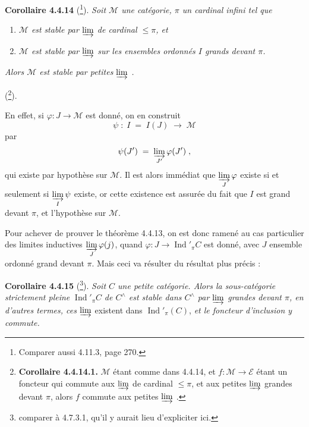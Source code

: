 \documentclass[11pt]{article}
\newcommand{\printedpage}[1]{\if\relax\detokenize{#1}\relax\else\marginpar{\footnotesize p.~#1}\fi}
\newcommand{\msp}[1]{\marginpar{\footnotesize [#1]}}
\newcommand{\Ind}{\operatorname{Ind}}
\begin{document}
\textbf{Corollaire 4.4.14} (\footnote{Comparer aussi 4.11.3, page 270.}). \textit{Soit $\mathcal{M}$ une catégorie, $\pi$ un cardinal infini tel que}
\begin{enumerate}
\item[a)] \textit{$\mathcal{M}$ est}
\msp{page 98}
\textit{stable par $\varinjlim$ de cardinal $\leqslant\pi$, et}
\item[b)] \textit{$\mathcal{M}$ est stable par $\varinjlim$ sur les ensembles ordonnés $I$ grands devant $\pi$.}
\end{enumerate}
\textit{Alors $\mathcal{M}$ est stable par petites $\varinjlim$ .}

(\footnote{\textbf{Corollaire 4.4.14.1.} $\mathcal{M}$ étant comme dans 4.4.14, et $f:\mathcal{M}\longrightarrow\mathcal{E}$ étant un foncteur qui commute aux $\varinjlim$ de cardinal $\leqslant\pi$, et aux petites $\varinjlim$ grandes devant $\pi$, alors $f$ commute aux petites $\varinjlim$ .}).

En effet, si $\varphi:J\longrightarrow\mathcal{M}$ est donné, on en construit
\[
\psi\;:\;I\;=\;I(J)\;\longrightarrow\;\mathcal{M}
\]
par
\[
\psi(J')\;=\;\varinjlim_{J'}\varphi(J')\;,
\]
qui existe par hypothèse sur $\mathcal{M}$. Il est alors immédiat que $\varinjlim\limits_{J}\varphi$ existe si et seulement si $\varinjlim\limits_{I}\psi$ existe, or cette existence est assurée du fait que $I$ est grand devant $\pi$, et l'hypothèse sur $\mathcal{M}$.

Pour achever de prouver le théorème 4.4.13, on est donc ramené au cas particulier des limites inductives $\varinjlim\limits_{J}\varphi(j)$, quand $\varphi:J\longrightarrow\Ind'_\pi C$ est donné, avec $J$ ensemble
\printedpage{25}
\msp{page 99}
ordonné grand devant $\pi$. Mais ceci va résulter du résultat plus précis :

\textbf{Corollaire 4.4.15} (\footnote{comparer à 4.7.3.1, qu'il y aurait lieu d'expliciter ici.}). \textit{Soit $C$ une petite catégorie. Alors la sous-catégorie strictement pleine} $\Ind'_\pi C$ \textit{de $C^\wedge$ est stable dans $C^\wedge$ par $\varinjlim$ grandes devant $\pi$, en d'autres termes, ces $\varinjlim$} existent dans $\Ind'_\pi(C)$, \textit{et le foncteur d'inclusion y commute.} %
\end{document}
